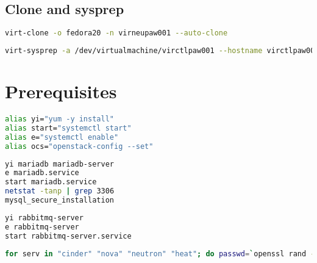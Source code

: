 \documentclass[11pt,letterpaper,oneside]{book}
\begin{document}
\section{Clone and sysprep}
\begin{lstlisting}[caption={Clone using virt-clone},language=bash]
virt-clone -o fedora20 -n virneupaw001 --auto-clone
\end{lstlisting}

\begin{lstlisting}[caption={Sysprep using virt-sysprep},language=bash]
virt-sysprep -a /dev/virtualmachine/virctlpaw001 --hostname virctlpaw001.virtomation.com --firstboot-command "sed -i -r 's/IPADDR=(\b[0-9]{1,3}\.){3}[0-9]{1,3}\b'/IPADDR=10.53.252.61/ /etc/sysconfig/network-scripts/ifcfg-eth0" --firstboot-command 'systemctl restart network' --firstboot-command 'yum install -y http://rdo.fedorapeople.org/rdo-release.rpm' --firstboot-command 'yum install openstack-packstack -y' 
\end{lstlisting}

\chapter{Prerequisites}

\begin{lstlisting}[caption={Bash Aliases},language=bash]
alias yi="yum -y install"
alias start="systemctl start"
alias e="systemctl enable"
alias ocs="openstack-config --set"
\end{lstlisting}

\begin{lstlisting}[caption={Database Install},language=bash]
yi mariadb mariadb-server
e mariadb.service 
start mariadb.service 
netstat -tanp | grep 3306
mysql_secure_installation 
\end{lstlisting}

\begin{lstlisting}[caption={RabbitMQ Install},language=bash]
yi rabbitmq-server
e rabbitmq-server
start rabbitmq-server.service
\end{lstlisting}

\begin{lstlisting}[caption={Create RabbitMQ User Accounts},language=bash]
for serv in "cinder" "nova" "neutron" "heat"; do passwd=`openssl rand -base64 8`; echo "$serv - $passwd"; rabbitmqctl add_user $serv $passwd; rabbitmqctl set_permissions -p / $serv ".*" ".*" ".*"; done
\end{lstlisting}
\end{document}
